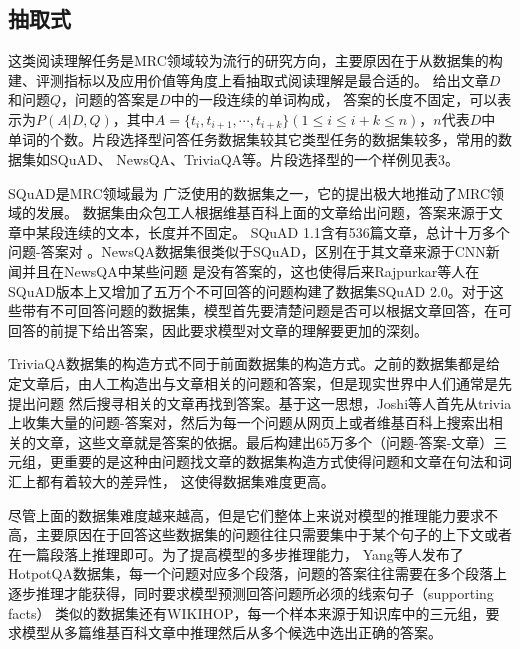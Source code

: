 \subsection{抽取式}
这类阅读理解任务是MRC领域较为流行的研究方向，主要原因在于从数据集的构建、评测指标以及应用价值等角度上看抽取式阅读理解是最合适的。
给出文章$D$和问题$Q$，问题的答案是$D$中的一段连续的单词构成，
答案的长度不固定，可以表示为$P(A|D,Q)$，其中$A=\{t_i,t_{i+1},\cdots,t_{i+k}\}(1\leq i\leq i+k\leq n)$，$n$代表$D$中
单词的个数。片段选择型问答任务数据集较其它类型任务的数据集较多，常用的数据集如SQuAD、
NewsQA、TriviaQA等。片段选择型的一个样例见表3。

SQuAD是MRC领域最为
广泛使用的数据集之一，它的提出极大地推动了MRC领域的发展。
数据集由众包工人根据维基百科上面的文章给出问题，答案来源于文章中某段连续的文本，长度并不固定。
SQuAD 1.1含有536篇文章，总计十万多个问题-答案对
。NewsQA数据集很类似于SQuAD，区别在于其文章来源于CNN新闻并且在NewsQA中某些问题
是没有答案的，这也使得后来Rajpurkar等人在SQuAD版本上又增加了五万个不可回答的问题构建了数据集SQuAD 2.0。对于这些带有不可回答问题的数据集，模型首先要清楚问题是否可以根据文章回答，在可回答的前提下给出答案，因此要求模型对文章的理解要更加的深刻。

TriviaQA数据集的构造方式不同于前面数据集的构造方式。之前的数据集都是给定文章后，由人工构造出与文章相关的问题和答案，但是现实世界中人们通常是先提出问题
然后搜寻相关的文章再找到答案。基于这一思想，Joshi等人首先从trivia上收集大量的问题-答案对，然后为每一个问题从网页上或者维基百科上搜索出相关的文章，这些文章就是答案的依据。最后构建出65万多个（问题-答案-文章）三元组，更重要的是这种由问题找文章的数据集构造方式使得问题和文章在句法和词汇上都有着较大的差异性，
这使得数据集难度更高。

尽管上面的数据集难度越来越高，但是它们整体上来说对模型的推理能力要求不高，主要原因在于回答这些数据集的问题往往只需要集中于某个句子的上下文或者在一篇段落上推理即可。为了提高模型的多步推理能力，
Yang等人发布了HotpotQA数据集，每一个问题对应多个段落，问题的答案往往需要在多个段落上逐步推理才能获得，同时要求模型预测回答问题所必须的线索句子（supporting facts）
类似的数据集还有WIKIHOP，每一个样本来源于知识库中的三元组，要求模型从多篇维基百科文章中推理然后从多个候选中选出正确的答案。

